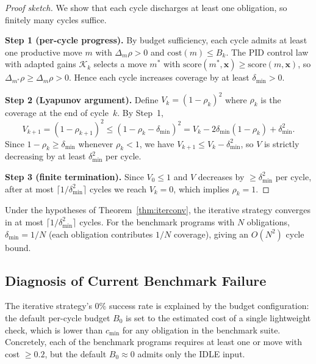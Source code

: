 \documentclass[11pt]{article}
\newcommand{\CL}{\mathcal{K}}              %
\newcommand{\xstate}{\mathbf{x}}           %
\newcommand{\Lyap}{V}                      %
\newcommand{\vcov}{\rho}                   %
\begin{document}
\begin{proof}[Proof sketch]
  We show that each cycle discharges at least one obligation, so
  finitely many cycles suffice.

  \medskip\noindent
  \textbf{Step 1 (per-cycle progress).}
  By budget sufficiency, each cycle admits at least one productive move
  $m$ with $\Delta_m\vcov > 0$ and $\mathrm{cost}(m) \leq B_k$.
  The PID control law with adapted gains $\CL_k$ selects a move $m^*$
  with $\mathrm{score}(m^*, \xstate) \geq \mathrm{score}(m, \xstate)$,
  so $\Delta_{m^*}\vcov \geq \Delta_m\vcov > 0$.  Hence each cycle
  increases coverage by at least $\delta_{\min} > 0$.

  \medskip\noindent
  \textbf{Step 2 (Lyapunov argument).}
  Define $\Lyap_k = (1 - \vcov_k)^2$ where $\vcov_k$ is the coverage
  at the end of cycle~$k$.  By Step~1,
  \[
    \Lyap_{k+1} = (1 - \vcov_{k+1})^2
    \leq (1 - \vcov_k - \delta_{\min})^2
    = \Lyap_k - 2\delta_{\min}(1 - \vcov_k) + \delta_{\min}^2.
  \]
  Since $1 - \vcov_k \geq \delta_{\min}$ whenever $\vcov_k < 1$,
  we have $\Lyap_{k+1} \leq \Lyap_k - \delta_{\min}^2$, so $\Lyap$
  is strictly decreasing by at least $\delta_{\min}^2$ per cycle.

  \medskip\noindent
  \textbf{Step 3 (finite termination).}
  Since $\Lyap_0 \leq 1$ and $\Lyap$ decreases by
  $\geq \delta_{\min}^2$ per cycle, after at most
  $\lceil 1/\delta_{\min}^2 \rceil$ cycles we reach $\Lyap_k = 0$,
  which implies $\vcov_k = 1$.
\end{proof}

\begin{corollary}
  \label{cor:itercycles}
  Under the hypotheses of Theorem~\ref{thm:iterconv}, the iterative
  strategy converges in at most
  $\lceil 1/\delta_{\min}^2 \rceil$ cycles.
  For the benchmark programs with $N$ obligations,
  $\delta_{\min} = 1/N$ (each obligation contributes $1/N$ coverage),
  giving an $O(N^2)$ cycle bound.
\end{corollary}

\subsection{Diagnosis of Current Benchmark Failure}

The iterative strategy's $0\%$ success rate is explained by the
budget configuration: the default per-cycle budget $B_0$ is set to
the estimated cost of a single lightweight check, which is
lower than $c_{\min}$ for any obligation in the benchmark suite.
Concretely, each of the \ppThirtyProgCount{} benchmark programs
requires at least one \VERIFY{} or \CONSTRUCT{} move with cost
$\geq 0.2$, but the default $B_0 \approx 0$ admits only the
\textsc{IDLE} input.
\end{document}
